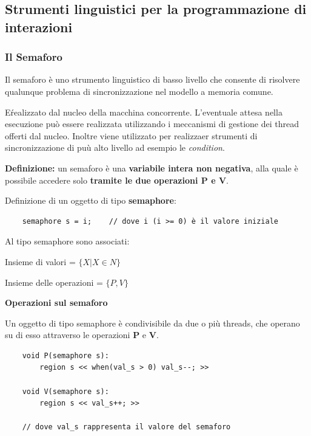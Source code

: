 \documentclass{article}
\begin{document}
\subsection{Strumenti linguistici per la programmazione di interazioni}
\subsubsection{Il Semaforo}

Il semaforo è uno strumento linguistico di basso livello che consente di risolvere qualunque problema di sincronizzazione nel modello a memoria comune.

E\' realizzato dal nucleo della macchina concorrente. L'eventuale attesa nella esecuzione può essere realizzata utilizzando i meccanismi di gestione dei thread offerti
dal nucleo. Inoltre viene utilizzato per realizzaer strumenti di sincronizzazione di puù alto livello ad esempio le \textit{condition}.

\vspace{3mm}
\textbf{Definizione:} un semaforo è una \textbf{variabile intera non negativa}, alla quale è possibile accedere solo \textbf{tramite le due operazioni P e V}.
\vspace{3mm}

Definizione di un oggetto di tipo \textbf{semaphore}:
\begin{lstlisting}
    semaphore s = i;    // dove i (i >= 0) è il valore iniziale
\end{lstlisting}

Al tipo semaphore sono associati:
\begin{center}
    Insieme di valori = $\{X | X \in N\}$
    \vspace{3mm}

    Insieme delle operazioni = $\{P, V\}$
\end{center}

\vspace{5mm}
\textbf{Operazioni sul semaforo}
\vspace{3mm}

Un oggetto di tipo semaphore è condivisibile da due o più threads, che operano su di esso attraverso le operazioni \textbf{P} e \textbf{V}.

\begin{lstlisting}
    void P(semaphore s):
        region s << when(val_s > 0) val_s--; >>

    void V(semaphore s):
        region s << val_s++; >>

    // dove val_s rappresenta il valore del semaforo
\end{lstlisting}
\end{document}
